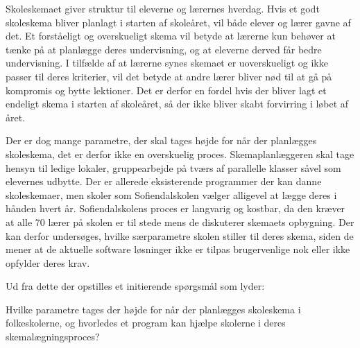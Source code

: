 Skoleskemaet giver struktur til eleverne og lærernes hverdag. Hvis et godt skoleskema bliver planlagt i starten af skoleåret, vil både elever og lærer gavne af det. Et forståeligt og overskueligt skema vil betyde at lærerne kun behøver at tænke på at planlægge deres undervisning, og at eleverne derved får bedre undervisning. I tilfælde af at lærerne synes skemaet er uoverskueligt og ikke passer til deres kriterier, vil det betyde at andre lærer bliver nød til at gå på kompromis og bytte lektioner. Det er derfor en fordel hvis der bliver lagt et endeligt skema i starten af skoleåret, så der ikke bliver skabt forvirring i løbet af året.

Der er dog mange parametre, der skal tages højde for når der planlægges skoleskema, det er derfor ikke en overskuelig proces. Skemaplanlæggeren skal tage hensyn til ledige lokaler, gruppearbejde på tværs af parallelle klasser såvel som elevernes udbytte. Der er allerede eksisterende programmer der kan danne skoleskemaer, men skoler som Sofiendalskolen vælger alligevel at lægge deres i hånden hvert år. Sofiendalskolens proces er langvarig og kostbar, da den kræver at alle 70 lærer på skolen er til stede mens de diskuterer skemaets opbygning. Der kan derfor undersøges, hvilke særparametre skolen stiller til deres skema, siden de mener at de aktuelle software løsninger ikke er tilpas brugervenlige nok eller ikke opfylder deres krav.

Ud fra dette der opstilles et initierende spørgsmål som lyder:

Hvilke parametre tages der højde for når der planlægges skoleskema i folkeskolerne, og hvorledes et program kan hjælpe skolerne i deres skemalægningsproces?
\newpage
